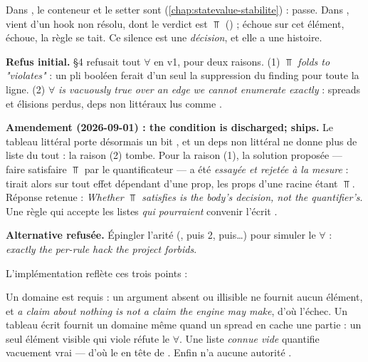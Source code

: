 Dans , le conteneur  et le setter sont  (\cref{chap:statevalue-stabilite}) :  passe. Dans ,  vient d'un hook non résolu, dont le verdict est $\Top$ () ;  échoue sur cet élément,  échoue, la règle se tait. Ce silence est une \emph{décision}, et elle a une histoire.

\begin{decision}
\textbf{Refus initial.}  §4 refusait tout $\forall$ en v1, pour deux raisons. (1) \og $\Top$ \emph{folds to "violates"}\fg{} : un pli booléen ferait d'un seul  la suppression du finding pour toute la ligne. (2) \og $\forall$ \emph{is vacuously true over an edge we cannot enumerate exactly}\fg{} : spreads et élisions perdus, deps non littéraux lus comme \code{[]}.

\textbf{Amendement (2026-09-01) : \og the condition is discharged;  ships\fg{}.} Le tableau littéral porte désormais un bit , et un deps non littéral ne donne plus de liste du tout : la raison (2) tombe. Pour la raison (1), la solution proposée --- faire satisfaire $\Top$ par le quantificateur --- a été \emph{essayée et rejetée à la mesure} :  tirait alors sur tout effet dépendant d'une prop, les props d'une racine étant $\Top$. Réponse retenue : \og \emph{Whether $\Top$ satisfies is the body's decision, not the quantifier's}\fg{}. Une règle qui accepte les listes \emph{qui pourraient} convenir l'écrit .

\textbf{Alternative refusée.} Épingler l'arité (, puis 2, puis\ldots) pour simuler le $\forall$ : \og \emph{exactly the per-rule hack the project forbids}\fg{}.
\end{decision}

L'implémentation reflète ces trois points :


Un domaine est requis : un argument absent ou illisible ne fournit aucun élément, et \og \emph{a claim about nothing is not a claim the engine may make}\fg{}, d'où l'échec. Un tableau écrit fournit un domaine même quand un spread en cache une partie : un seul élément visible qui viole réfute le $\forall$. Une liste \emph{connue vide} quantifie vacuement vrai --- d'où le  en tête de . Enfin  n'a aucune autorité \Error{}.

